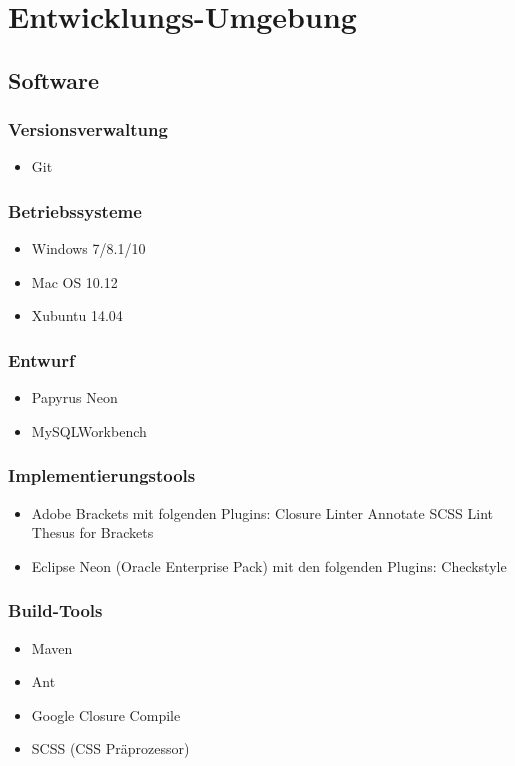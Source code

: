 \section{Entwicklungs-Umgebung}
\subsection{Software}
	\subsubsection{Versionsverwaltung}
		\begin{itemize}
			\item Git
		\end{itemize}
	\subsubsection{Betriebssysteme}
		\begin{itemize}
			\item Windows 7/8.1/10
			\item Mac OS 10.12
			\item Xubuntu 14.04
		\end{itemize}
	\subsubsection{Entwurf}
		\begin{itemize}
			\item Papyrus Neon
			\item MySQLWorkbench
		\end{itemize}
	\subsubsection{Implementierungstools}
		\begin{itemize}
			\item Adobe Brackets mit folgenden Plugins:
				\subitem Closure Linter
				\subitem Annotate
				\subitem SCSS Lint
				\subitem Thesus for Brackets
			\item Eclipse Neon (Oracle Enterprise Pack) mit den folgenden Plugins:
				\subitem Checkstyle
		\end{itemize}
	\subsubsection{Build-Tools}
		\begin{itemize}
			\item Maven
			\item Ant
			\item Google Closure Compile
			\item SCSS (CSS Präprozessor)
		\end{itemize}

